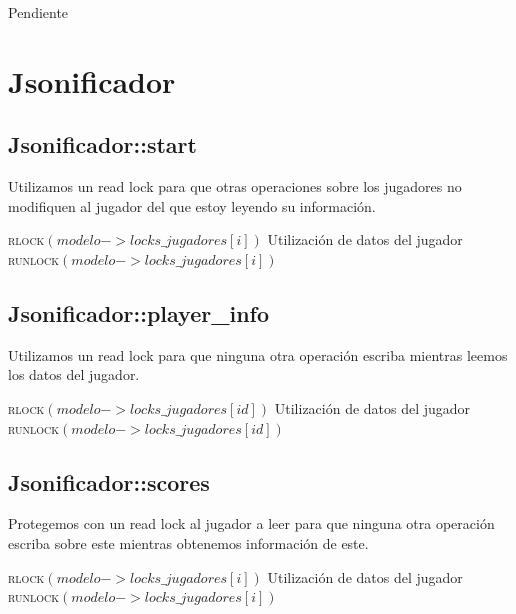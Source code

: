 \documentclass[a4paper,10pt,twoside]{article}
\newenvironment{pseudo}[1][]{%
    \vspace{0.5em}%
    \begin{algorithmic}%
}
{%
    \end{algorithmic}%
    \vspace{0.5em}%
}
\newcommand{\Fn}[2]{\textsc{#1}$(#2)$}
\begin{document}
Pendiente




\section{Jsonificador}


\subsection{Jsonificador::start}
Utilizamos un read lock para que otras operaciones sobre los jugadores no modifiquen al jugador del que estoy
leyendo su información.
\begin{pseudo}
       \State \Fn{rlock}{modelo->locks\_jugadores[i]}
       \State Utilización de datos del jugador
       \State \Fn{runlock}{modelo->locks\_jugadores[i]}
    \EndFor
\end{pseudo}

\subsection{Jsonificador::player\_info}
Utilizamos un read lock para que ninguna otra operación escriba mientras leemos los datos del jugador.
\begin{pseudo}
    \State \Fn{rlock}{modelo->locks\_jugadores[id]}
    \State Utilización de datos del jugador
    \State \Fn{runlock}{modelo->locks\_jugadores[id]}
\end{pseudo}


\subsection{Jsonificador::scores}
Protegemos con un read lock al jugador a leer para que ninguna otra operación escriba
sobre este mientras obtenemos información de este.
\begin{pseudo}
       \State \Fn{rlock}{modelo->locks\_jugadores[i]}
       \State Utilización de datos del jugador
       \State \Fn{runlock}{modelo->locks\_jugadores[i]}
    \EndFor
\end{pseudo}
\end{document}

